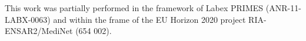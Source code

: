 \documentclass[a4paper,11pt]{article}
\begin{document}





\acknowledgments
This work was partially performed in the framework of Labex PRIMES (ANR-11-LABX-0063) and within the frame of the EU Horizon 2020 project RIA-ENSAR2/MediNet (654 002).  




%
%

\end{document}
